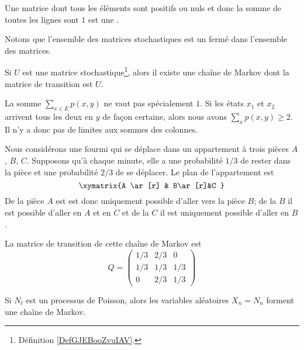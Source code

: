 \begin{definition}      \label{DefGJEBooZvuIAV}
    Une matrice dont tous les éléments sont positifs ou nuls et donc la somme de toutes les lignes sont \( 1\) est une .
\end{definition}
Notons que l'ensemble des matrices stochastiques est un fermé dans l'ensemble des matrices.

\begin{lemma}
    Si \( U\) est une matrice stochastique\footnote{Définition \ref{DefGJEBooZvuIAV}.}, alors il existe une chaîne de Markov dont la matrice de transition est \( U\).
\end{lemma}

\begin{remark}
    La somme \( \sum_{x\in E}p(x,y)\) ne vaut pas spécialement \( 1\). Si les états \( x_1\) et \( x_2\) arrivent tous les deux en \( y\) de façon certaine, alors nous avons \( \sum_xp(x,y)\geq 2\). Il n'y a donc pas de limites aux sommes des colonnes.
\end{remark}

\begin{example}
    Nous considérons une fourmi qui se déplace dans un appartement à trois pièces \( A\), \( B\), \( C\). Supposons qu'à chaque minute, elle a une probabilité \( 1/3\) de rester dans la pièce et une probabilité \( 2/3\) de se déplacer. Le plan de l'appartement est
    \begin{equation}
        \xymatrix{%
        A \ar[r]      &  B\ar[r]&C
           }
    \end{equation}
    De la pièce \( A\) est est donc uniquement possible d'aller vers la pièce \( B\); de la \( B\) il est possible d'aller en \( A\) et en \( C\) et de la \( C\) il est uniquement possible d'aller en \( B\).

    La matrice de transition de cette chaîne de Markov est 
    \begin{equation}
        Q=\begin{pmatrix}
            1/3    &   2/3    &   0    \\
            1/3    &   1/3    &   1/3    \\
            0    &   2/3    &   1/3
        \end{pmatrix}
    \end{equation}
\end{example}

\begin{example}
    Si \( N_t\) est un processus de Poisson, alors les variables aléatoires \( X_n=N_n\) forment une chaîne de Markov.
\end{example}

